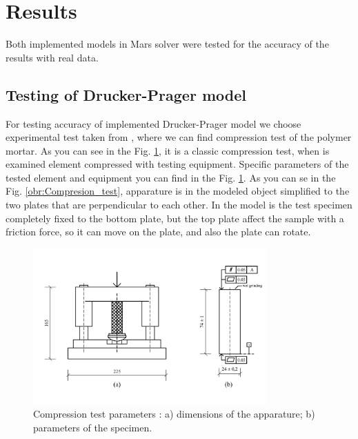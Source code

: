 \thispagestyle{plain}
\section{Results}
\indent

Both implemented models in Mars solver \cite{mars} were tested for the accuracy of the results with real data. 

\subsection{Testing of Drucker-Prager model}
\indent
 
For testing accuracy of implemented Drucker-Prager model we choose experimental test taken from \cite{Deuch_phd_thesis}, where we can find compression test of the polymer mortar. As you can see in the Fig. \ref{obr:test_param}, it is a classic compression test, when is examined element compressed with testing equipment. Specific parameters of the tested element and equipment you can find in the Fig. \ref{obr:test_param}. As you can se in the Fig. \ref{obr:Compresion_test}, apparature is in the modeled object simplified to the two plates that are perpendicular to each other. In the model is the test specimen completely fixed to the bottom plate, but the top plate affect the sample with a friction force, so it can move on the plate, and also the plate can rotate.


\begin{figure}[h!]
	\centering
	\includegraphics[width=0.8\textwidth]{obrazky/test_parameters.png}
	\caption[Compression test parameters]{Compression test parameters \cite{Deuch_phd_thesis}: a) dimensions of the apparature; b) parameters of the specimen.}\label{obr:test_param}
\end{figure}


